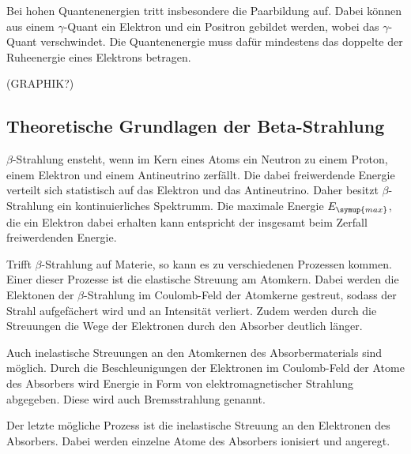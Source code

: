 Bei hohen Quantenenergien tritt insbesondere die Paarbildung auf. Dabei können aus
einem $\gamma$-Quant ein Elektron und ein Positron gebildet werden, wobei das
$\gamma$-Quant verschwindet. Die Quantenenergie muss dafür mindestens das doppelte
der Ruheenergie eines Elektrons betragen.

(GRAPHIK?)


\subsection{Theoretische Grundlagen der Beta-Strahlung} %
\label{subsec:beta}

$\beta$-Strahlung ensteht, wenn im Kern eines Atoms ein Neutron zu einem Proton, einem
Elektron und einem Antineutrino zerfällt. Die dabei freiwerdende Energie verteilt sich
statistisch auf das Elektron und das Antineutrino. Daher besitzt $\beta$-Strahlung
ein kontinuierliches Spektrumm. Die maximale Energie $E_{\symup{max}}$, die ein
Elektron dabei erhalten kann entspricht der insgesamt beim Zerfall freiwerdenden Energie.

Trifft $\beta$-Strahlung auf Materie, so kann es zu verschiedenen Prozessen kommen.
Einer dieser Prozesse ist die elastische Streuung am Atomkern. Dabei werden die
Elektonen der $\beta$-Strahlung im Coulomb-Feld der Atomkerne gestreut, sodass der
Strahl aufgefächert wird und an Intensität verliert. Zudem werden durch die Streuungen
die Wege der Elektronen durch den Absorber deutlich länger.

Auch inelastische Streuungen an den Atomkernen des Absorbermaterials sind möglich.
Durch die Beschleunigungen der Elektronen im Coulomb-Feld der Atome des Absorbers
wird Energie in Form von elektromagnetischer Strahlung abgegeben. Diese wird auch
Bremsstrahlung genannt.

Der letzte mögliche Prozess ist die inelastische Streuung an den Elektronen des
Absorbers. Dabei werden einzelne Atome des Absorbers ionisiert und angeregt.
